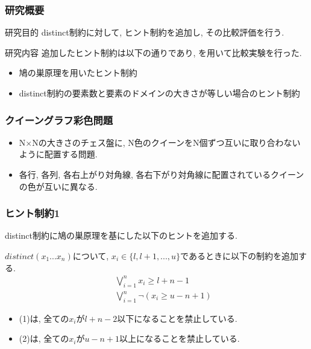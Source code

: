 \documentclass [dvipdfmx,12pt]{beamer}
\begin{document}
\begin{frame}
\frametitle{研究概要}
\begin{alertblock}{研究目的}
distinct制約に対して, ヒント制約を追加し, その比較評価を行う.
\end{alertblock}
\begin{block}{研究内容}
追加したヒント制約は以下の通りであり, を用いて比較実験を行った.
\begin{itemize}
\item 鳩の巣原理を用いたヒント制約
\item distinct制約の要素数と要素のドメインの大きさが等しい場合のヒント制約
\end{itemize}
\end{block}
\end{frame}



\begin{frame}
\frametitle{クイーングラフ彩色問題}

\begin{itemize}
\item N×Nの大きさのチェス盤に, N色のクイーンをN個ずつ互いに取り合わないように配置する問題.
\item \alert{各行}, \alert{各列}, \alert{各右上がり対角線}, \alert{各右下がり対角線}に配置されているクイーンの色が互いに異なる.
\end{itemize}
\end{frame}



\begin{frame}
\frametitle{ヒント制約1}
distinct制約に鳩の巣原理を基にした以下のヒントを追加する.
\begin{exampleblock}{}
$distinct(x_1 ... x_n)$について, $x_i \in \{l, l+1, ..., u\}$であるときに以下の制約を追加する.
\begin{eqnarray}
&& \bigvee_{i=1}^n   x_i \geq l+n-1\\
&& \bigvee_{i=1}^n \lnot(x_i \geq u-n+1)
\end{eqnarray}
\end{exampleblock}
\begin{itemize}
\item (1)は, 全ての$x_i$が$l+n-2$以下になることを禁止している.\\
\item (2)は, 全ての$x_i$が$u-n+1$以上になることを禁止している.\\
\end{itemize}
\end{frame}
\end{document}
